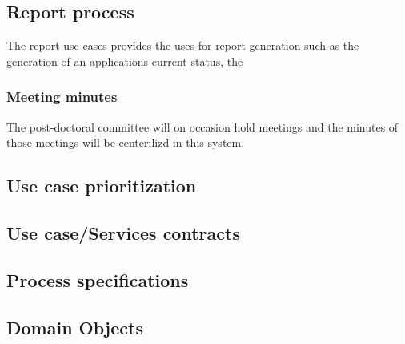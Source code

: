 \documentclass[12pt]{article}
\begin{document}
		\subsection{Report process}
		The report use cases provides the uses for report generation such as the generation of an applications current status, the 
		\subsubsection{Meeting minutes} %
		The post-doctoral committee will on occasion hold meetings and the minutes of those meetings will be centerilizd in this system.
		\vspace{0.2in}
		
		\subsection{Use case prioritization} %
		\vspace{0.2in}
		
		\vspace{0.2in}
		
		\subsection{Use case/Services contracts} %
		\vspace{0.2in}
		
		\vspace{0.2in}
		
		\subsection{Process specifications} %
		\vspace{0.2in}
		
		\vspace{0.2in}
		
		\subsection{Domain Objects} %
\end{document}
